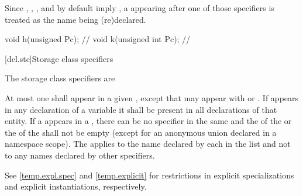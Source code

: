 \pnum
{}%
%
%
%
\begin{note}
Since , , , and 
by default imply , a  appearing after one
of those specifiers is treated as the name being (re)declared.
\begin{example}
\begin{codeblock}
void h(unsigned Pc);            // 
void k(unsigned int Pc);        // 
\end{codeblock}
\end{example}
\end{note}

[dcl.stc]{Storage class specifiers}%
%
%
%
%
%

\pnum
The storage class specifiers are
\begin{bnf}
\br
    \br
    \br
    \br
\end{bnf}

At most one  shall appear in a given
, except that  may appear with  or
. If  appears in any declaration of
a variable it shall be present in all declarations of that entity. If a
appears in a , there can be no
 specifier in the same  and
the  of the  or
the  of the 
shall not be empty (except for an anonymous union declared in a namespace scope).
The  applies to the name declared by each
 in the list and not to any names declared by
other specifiers.
\begin{note}
See \ref{temp.expl.spec} and \ref{temp.explicit} for restrictions
in explicit specializations and explicit instantiations, respectively.
\end{note}

